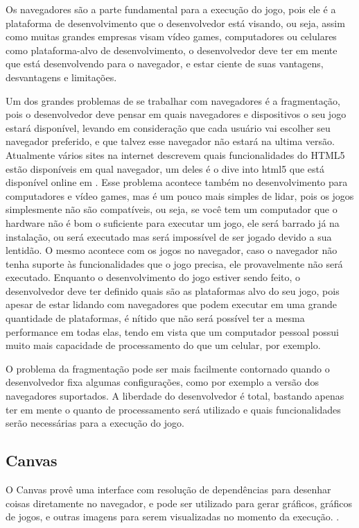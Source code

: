 Os navegadores são a parte fundamental para a execução do jogo, pois
ele é a plataforma de desenvolvimento que o desenvolvedor está visando,
ou seja, assim como muitas grandes empresas visam vídeo games,
computadores ou celulares como plataforma-alvo de desenvolvimento, o
desenvolvedor deve ter em mente que está desenvolvendo para o
navegador, e estar ciente de suas vantagens, desvantagens e
limitações.

Um dos grandes problemas de se trabalhar com navegadores é a
fragmentação, pois o desenvolvedor deve pensar em quais navegadores e
dispositivos o seu jogo estará disponível, levando em consideração
que cada usuário vai escolher seu navegador preferido, e que talvez
esse navegador não estará na ultima versão. Atualmente vários sites na
internet descrevem quais funcionalidades do HTML5 estão disponíveis em
qual navegador, um deles é o dive into html5 que está disponível
online em .
Esse problema acontece também no desenvolvimento para computadores e
vídeo games, mas é um pouco mais simples de lidar, pois os jogos
simplesmente não são compatíveis, ou seja, se você tem um computador
que o hardware não é bom o suficiente para executar um jogo, ele será
barrado já na instalação, ou será executado mas será impossível de ser
jogado devido a sua lentidão. O mesmo acontece com os jogos no
navegador, caso o navegador não tenha suporte às funcionalidades que o
jogo precisa, ele provavelmente não será executado. Enquanto o
desenvolvimento do jogo estiver sendo feito, o desenvolvedor deve ter
definido quais são as plataformas alvo do seu jogo, pois apesar de
estar lidando com navegadores que podem executar em uma grande
quantidade de plataformas, é nítido que não será possível ter a mesma
performance em todas elas, tendo em vista que um computador pessoal
possui muito mais capacidade de processamento do que um celular, por
exemplo.

O problema da fragmentação pode ser mais facilmente contornado quando
o desenvolvedor fixa algumas configurações, como por exemplo a versão
dos navegadores suportados. A liberdade do desenvolvedor é total,
bastando apenas ter em mente o quanto de processamento será utilizado
e quais funcionalidades serão necessárias para a execução do jogo.

\subsection{Canvas}

O Canvas provê uma interface com resolução de dependências para
desenhar coisas diretamente no navegador, e pode ser utilizado para
gerar gráficos, gráficos de jogos, e outras imagens para serem
visualizadas no momento da execução. \cite{website:w3ccanvas}.

